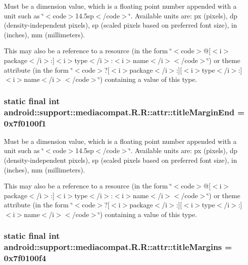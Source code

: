 Must be a dimension value, which is a floating point number appended with a unit such as \char`\"{}$<$code$>$14.5sp$<$/code$>$\char`\"{}. Available units are: px (pixels), dp (density-independent pixels), sp (scaled pixels based on preferred font size), in (inches), mm (millimeters). 

This may also be a reference to a resource (in the form \char`\"{}$<$code$>$@\mbox{[}$<$i$>$package$<$/i$>$:\mbox{]}$<$i$>$type$<$/i$>$:$<$i$>$name$<$/i$>$$<$/code$>$\char`\"{}) or theme attribute (in the form \char`\"{}$<$code$>$?\mbox{[}$<$i$>$package$<$/i$>$:\mbox{]}\mbox{[}$<$i$>$type$<$/i$>$:\mbox{]}$<$i$>$name$<$/i$>$$<$/code$>$\char`\"{}) containing a value of this type. \hypertarget{classandroid_1_1support_1_1mediacompat_1_1_r_1_1attr_ebc1e3e2f1c24076a20111ccd8266de9}{
\subsubsection[{titleMarginEnd}]{\setlength{\rightskip}{0pt plus 5cm}static final int android::support::mediacompat.R.R::attr::titleMarginEnd = 0x7f0100f1}}
\label{classandroid_1_1support_1_1mediacompat_1_1_r_1_1attr_ebc1e3e2f1c24076a20111ccd8266de9}


Must be a dimension value, which is a floating point number appended with a unit such as \char`\"{}$<$code$>$14.5sp$<$/code$>$\char`\"{}. Available units are: px (pixels), dp (density-independent pixels), sp (scaled pixels based on preferred font size), in (inches), mm (millimeters). 

This may also be a reference to a resource (in the form \char`\"{}$<$code$>$@\mbox{[}$<$i$>$package$<$/i$>$:\mbox{]}$<$i$>$type$<$/i$>$:$<$i$>$name$<$/i$>$$<$/code$>$\char`\"{}) or theme attribute (in the form \char`\"{}$<$code$>$?\mbox{[}$<$i$>$package$<$/i$>$:\mbox{]}\mbox{[}$<$i$>$type$<$/i$>$:\mbox{]}$<$i$>$name$<$/i$>$$<$/code$>$\char`\"{}) containing a value of this type. \hypertarget{classandroid_1_1support_1_1mediacompat_1_1_r_1_1attr_bfa4db5da2763fb1636c06db4af0582a}{
\subsubsection[{titleMargins}]{\setlength{\rightskip}{0pt plus 5cm}static final int android::support::mediacompat.R.R::attr::titleMargins = 0x7f0100f4}}
\label{classandroid_1_1support_1_1mediacompat_1_1_r_1_1attr_bfa4db5da2763fb1636c06db4af0582a}


